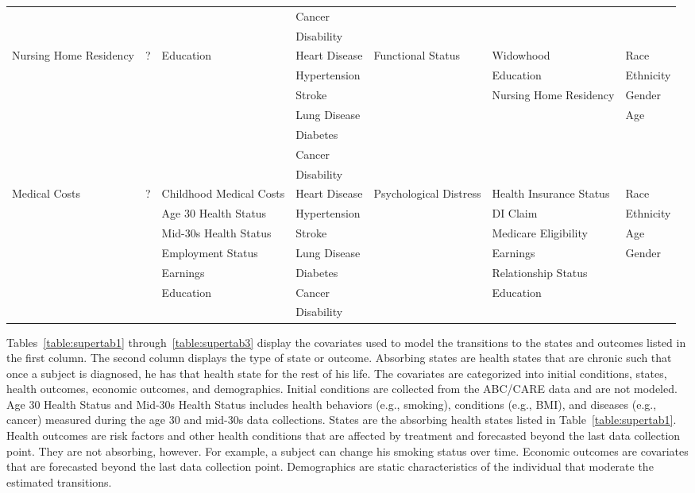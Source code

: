 \begin{table}
\begin{tiny}
\begin{tabular}{lllllll}
& & & Cancer & & & \\
& & & Disability & & & \\
\midrule
Nursing Home Residency & ? & Education & Heart Disease & Functional Status & Widowhood & Race \\
& & & Hypertension & & Education & Ethnicity \\
& & & Stroke & &  Nursing Home Residency & Gender \\
& & & Lung Disease  & & & Age \\
&  & & Diabetes & & & \\
&  & & Cancer & & & \\
&  & & Disability & & & \\
\midrule
Medical Costs & ? & Childhood Medical Costs & Heart Disease & Psychological Distress & Health Insurance Status & Race \\
& & Age 30 Health Status  & Hypertension & & DI Claim & Ethnicity \\
& & Mid-30s Health Status & Stroke & & Medicare Eligibility & Age \\
& & Employment Status & Lung Disease & & Earnings & Gender \\
& & Earnings  & Diabetes & & Relationship Status &  \\
& & Education & Cancer & & Education  & \\
& & & Disability & & & \\
\bottomrule
\end{tabular}
\end{tiny}
\end{table}

Tables~\ref{table:supertab1} through~\ref{table:supertab3} display the covariates used to model the transitions to the states and outcomes listed in the first column. The second column displays the type of state or outcome. Absorbing states are health states that are chronic such that once a subject is diagnosed, he has that health state for the rest of his life. The covariates are categorized into initial conditions, states, health outcomes, economic outcomes, and demographics. Initial conditions are collected from the ABC/CARE data and are not modeled. Age 30 Health Status and Mid-30s Health Status includes health behaviors (e.g., smoking), conditions (e.g., BMI), and diseases (e.g., cancer) measured during the age 30 and mid-30s data collections. States are the absorbing health states listed in Table~\ref{table:supertab1}. Health outcomes are risk factors and other health conditions that are affected by treatment and forecasted beyond the last data collection point. They are not absorbing, however. For example, a subject can change his smoking status over time. Economic outcomes are covariates that are forecasted beyond the last data collection point. Demographics are static characteristics of the individual that moderate the estimated transitions.



